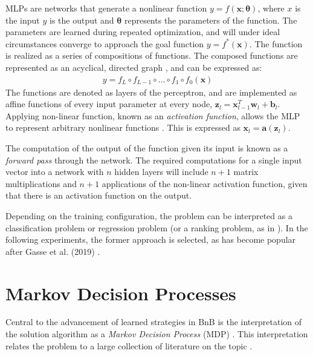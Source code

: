 MLPs are networks that generate a nonlinear function $y = f(\mathbf{x}; \bm{\theta})$, where $x$ is the input $y$ is the output and $\bm{\theta}$ represents the parameters of the function. The parameters are learned during repeated optimization, and will under ideal circumstances converge to approach the goal function $y = f^*(\mathbf{x})$. The function is realized as a series of compositions of functions. The composed functions are represented as an acyclical, directed graph \cite{nielsen2018neural}, and can be expressed as:
\begin{align}
    y = f_L \circ f_{L-1} \circ \ldots \circ f_{1} \circ f_{0} (\mathbf{x})  
\end{align}
The functions are denoted as layers of the perceptron, and are implemented as affine functions of every input parameter at every node, $\mathbf{z}_l = \mathbf{x}_{l-1}^T \mathbf{w}_l + \mathbf{b}_l$. Applying non-linear function, known as an \textit{activation function}, allows the \gls{MLP} to represent arbitrary nonlinear functions \cite{goodfellow2016deep}. This is expressed as $\mathbf{x}_l = \mathbf{a}(\mathbf{z}_l)$.

The computation of the output of the function given its input is known as a \textit{forward pass} through the network. The required computations for a single input vector into a network with $ n $ hidden layers will include $ n + 1 $ matrix multiplications and $ n + 1 $ applications of the non-linear activation function, given that there is an activation function on the output. 

Depending on the training configuration, the problem can be interpreted as a classification problem or regression problem (or a ranking problem, as in \cite{khalil2016learning}). In the following experiments, the former approach is selected, as has become popular after Gasse et al. (2019) \cite{gasse2019exact}. 





\section{Markov Decision Processes}\label{sec:mdp}

Central to the advancement of learned strategies in \gls{BnB} is the interpretation of the solution algorithm as a \textit{Markov Decision Process} (\gls{MDP}) \cite{gasse2019exact}. This interpretation relates the problem to a large collection of literature on the topic \cite{howard1960dynamic}.

